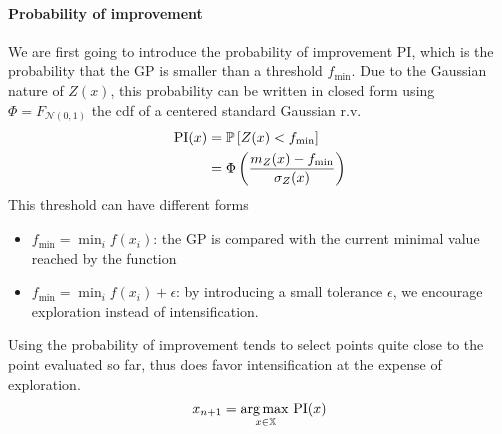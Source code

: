 \documentclass[../../Main_ManuscritThese.tex]{subfiles}
\begin{document}
\paragraph{Probability of improvement}
We are first going to introduce the probability of improvement $\mathrm{PI}$, which is the probability that the GP is smaller than a threshold $f_{\min}$. Due to the Gaussian nature of $Z(x)$, this probability can be written in closed form using $\Phi = F_{\mathcal{N}(0, 1)}$ the cdf of a centered standard Gaussian r.v.\
\begin{align}
  \mathrm{PI}(x) &= \Prob%
                   \left[Z(x) < f_{\min}\right] \\
                 &= \Phi\left(\frac{m_Z(x) - f_{\min}}{\sigma_Z(x)}\right)
\end{align}
This threshold can have different forms
\begin{itemize}
\item $f_{\min} = \min_{i} f(x_i)$: the GP is compared with the current minimal value reached by the function
\item $f_{\min} = \min_i f(x_i) + \epsilon$: by introducing a small tolerance $\epsilon$, we encourage exploration instead of intensification.
\end{itemize}
Using the probability of improvement tends to select points quite close to the point evaluated so far, thus does favor intensification at the expense of exploration.
\begin{equation}
  x_{n+1} = \operatorname*{arg\,max \,}_{x\in \mathbb{X}} \mathrm{PI}(x)
\end{equation}
\end{document}
